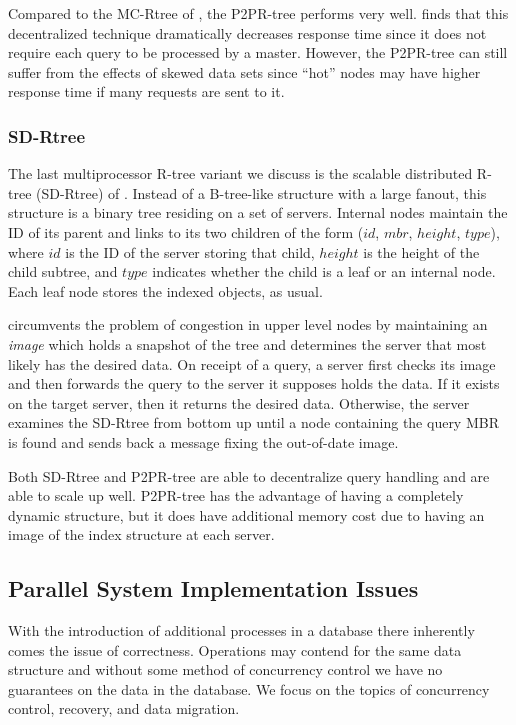 Compared to the MC-Rtree of \cite{schnitzer1999master}, the P2PR-tree performs
very well. \cite{mondal2005p2pr} finds that this decentralized technique 
dramatically decreases response time since it does
not require each query to be processed by a master. However, the P2PR-tree can
still suffer from the effects of skewed data sets since ``hot'' nodes may have
higher response time if many requests are sent to it. 

\subsubsection{SD-Rtree}
The last multiprocessor R-tree variant we discuss is the scalable distributed R-tree
(SD-Rtree) of \cite{du2007sd}. Instead of a B-tree-like structure with a large
fanout, this structure is a binary tree residing on a set of servers.
Internal nodes maintain the ID of its parent and links to its two children of 
the form ($id$, $mbr$, $height$, $type$), where $id$ is the ID of the server 
storing that child, $height$ is the height of the child subtree, and $type$ 
indicates whether the child is a leaf or an internal node. Each leaf node stores 
the indexed objects, as usual.

\cite{du2007sd} circumvents the problem of congestion in upper level nodes by 
maintaining an \emph{image} which holds a snapshot of the tree and determines 
the server that most likely has the desired data. On receipt of a query, a 
server first checks its image and then forwards the query to the server it 
supposes holds the data. If it exists on the target server, then it returns the
desired data. Otherwise, the server examines the SD-Rtree from bottom up until a 
node containing the query MBR is found and sends back a message fixing the 
out-of-date image. %

Both SD-Rtree and P2PR-tree are able to decentralize query handling and are able
to scale up well. P2PR-tree has the advantage of having a completely dynamic 
structure, but it does have additional memory cost due to having an image of the 
index structure at each server.

\subsection{Parallel System Implementation Issues}
With the introduction of additional processes in a database there inherently
comes the issue of correctness. Operations may contend for the same data 
structure and without some method of concurrency control we have no guarantees
on the data in the database. We focus on the topics of concurrency control, 
recovery, and data migration. 

